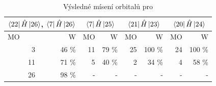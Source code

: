 \documentclass[
  printed, %
  table,   %
  lof,     %
  lot,     %
  oneside,
]{fithesis3}
\begin{document}
\begin{figure}
\begin{center}
\label{obr_h4sio4_vysledky_I}
\end{center}
\end{figure}


  
\begin{table}[htbp]
\caption{Výsledné mísení orbitalů pro }
\begin{center}
\begin{tabular}{|r|r|r|r|r|r|r|r|}
\hline
\multicolumn{2}{|c|}{$\bra{22}{\hat{H}}\ket{26}$, $\bra{7}{\hat{H}}\ket{26}$} & \multicolumn{2}{|c|}{$\bra{7}{\hat{H}}\ket{25}$}& \multicolumn{2}{|c|}{$\bra{21}{\hat{H}}\ket{23}$} &\multicolumn{2}{|c|}{$\bra{20}{\hat{H}}\ket{24}$} \\
\hline
\hline
\multicolumn{1}{|l|}{MO} & \multicolumn{1}{r|}{W} & \multicolumn{1}{l|}{MO} & \multicolumn{1}{r|}{W} & MO & \multicolumn{1}{r|}{W}& MO & \multicolumn{1}{r|}{W} \\ \hline
3 & 46 \% & 11 & 79 \% &25 & 100 \%& 24 & 100 \% \\ \hline
11 & 71 \% & 5 & 40 \% & 2 & 34 \% &4 & 58 \% \\ \hline
26 & 98 \% & - & - &  -& - &-&- \\ \hline
\end{tabular}
\end{center}
\label{tab_sioh3ch3_vysledky}
\end{table}
\end{document}
